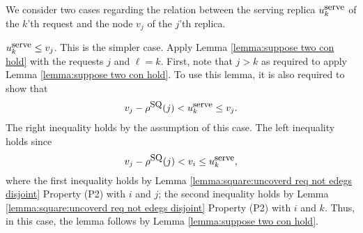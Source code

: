 \documentclass[11pt]{article}
\newcommand{\uSQ}{u^{\mbox{\small\upshape serve}}}
\newcommand{\rhoSQ}[0]{\rho^{\mbox{\small\upshape SQ}}}
\begin{document}
\vspace{0.2cm}
We consider two cases regarding the relation between the serving replica $\uSQ_k$ of the $k$'th request and the node $v_j$ of the $j$'th replica.

\vspace{0.5cm}
 $\uSQ_k\leq v_j$. This is the simpler case.
Apply Lemma \ref{lemma:suppose two con hold} with the requests $j$ and $\ell=k$.
First, note that $j>k$ as required to apply Lemma  \ref{lemma:suppose two con hold}.
To use this lemma, it is also required to show that
\begin{eqnarray}
\label{ineq: vj-rhoSQj < vk leq vj}
v_j-\rhoSQ(j)<\uSQ_k\leq v_j.
\end{eqnarray}
The right inequality holds by the assumption of this case.
The left inequality holds
since
$$
v_j-\rhoSQ(j)<v_i\leq \uSQ_k,
$$
where the first inequality holds by Lemma \ref{lemma:square:uncoverd req not edegs disjoint} Property (P2) with $i$ and $j$;
the second inequality holds by Lemma \ref{lemma:square:uncoverd req not edegs disjoint} Property (P2) with $i$ and $k$.
Thus, in this case, the lemma follows by Lemma \ref{lemma:suppose two con hold}.



\vspace{0.5cm}
\end{document}
